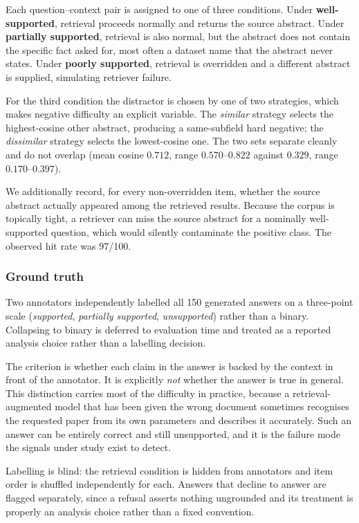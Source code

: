 \documentclass[11pt,a4paper]{article}
\begin{document}
Each question--context pair is assigned to one of three conditions. Under
\textbf{well-supported}, retrieval proceeds normally and returns the source
abstract. Under \textbf{partially supported}, retrieval is also normal, but the
abstract does not contain the specific fact asked for, most often a dataset
name that the abstract never states. Under \textbf{poorly supported},
retrieval is overridden and a different abstract is supplied, simulating
retriever failure.

For the third condition the distractor is chosen by one of two strategies, which
makes negative difficulty an explicit variable. The \emph{similar} strategy
selects the highest-cosine other abstract, producing a same-subfield hard
negative; the \emph{dissimilar} strategy selects the lowest-cosine one. The two
sets separate cleanly and do not overlap (mean cosine $0.712$, range
$0.570$--$0.822$ against $0.329$, range $0.170$--$0.397$).

We additionally record, for every non-overridden item, whether the source
abstract actually appeared among the retrieved results. Because the corpus is
topically tight, a retriever can miss the source abstract for a nominally
well-supported question, which would silently contaminate the positive class.
The observed hit rate was 97/100.

\subsubsection{Ground truth}

Two annotators independently labelled all 150 generated answers on a three-point
scale (\emph{supported}, \emph{partially supported}, \emph{unsupported})
rather than a binary. Collapsing to binary is deferred to evaluation time and
treated as a reported analysis choice rather than a labelling decision.

The criterion is whether each claim in the answer is backed by the context in
front of the annotator. It is explicitly \emph{not} whether the answer is true
in general. This distinction carries most of the difficulty in practice, because
a retrieval-augmented model that has been given the wrong document sometimes
recognises the requested paper from its own parameters and describes it
accurately. Such an answer can be entirely correct and still unsupported, and it
is the failure mode the signals under study exist to detect.

Labelling is blind: the retrieval condition is hidden from annotators and item
order is shuffled independently for each. Answers that decline to answer are
flagged separately, since a refusal asserts nothing ungrounded and its treatment
is properly an analysis choice rather than a fixed convention.
\end{document}
